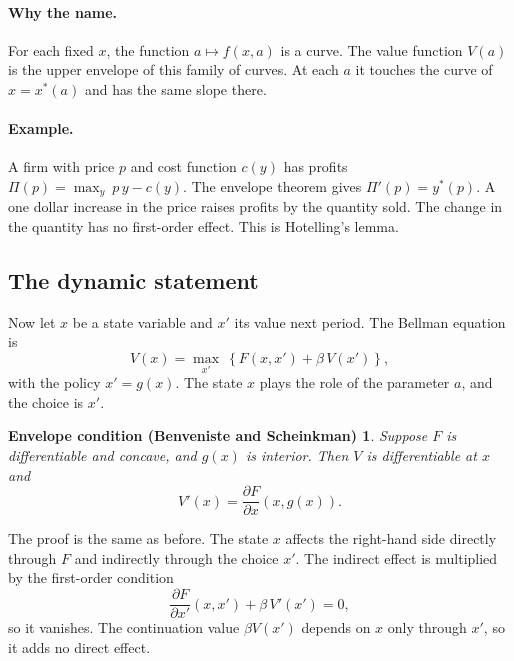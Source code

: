 \documentclass[11pt]{article}
\newtheorem*{envelopedyn}{Envelope condition (Benveniste and Scheinkman)}
\begin{document}
\paragraph{Why the name.} For each fixed $x$, the function $a \mapsto f(x, a)$ is a curve. The value function $V(a)$ is the upper envelope of this family of curves. At each $a$ it touches the curve of $x = x^{*}(a)$ and has the same slope there.

\paragraph{Example.} A firm with price $p$ and cost function $c(y)$ has profits $\Pi(p) = \max_{y} \ p\, y - c(y)$. The envelope theorem gives $\Pi'(p) = y^{*}(p)$. A one dollar increase in the price raises profits by the quantity sold. The change in the quantity has no first-order effect. This is Hotelling's lemma.

\subsection{The dynamic statement}

Now let $x$ be a state variable and $x'$ its value next period. The Bellman equation is
\begin{equation*}
V(x) = \max_{x'} \ \left\{ F(x, x') + \beta\, V(x') \right\} ,
\end{equation*}
with the policy $x' = g(x)$. The state $x$ plays the role of the parameter $a$, and the choice is $x'$.

\begin{envelopedyn}
Suppose $F$ is differentiable and concave, and $g(x)$ is interior. Then $V$ is differentiable at $x$ and
\begin{equation*}
V'(x) = \frac{\partial F}{\partial x} \left( x, g(x) \right) .
\end{equation*}
\end{envelopedyn}

The proof is the same as before. The state $x$ affects the right-hand side directly through $F$ and indirectly through the choice $x'$. The indirect effect is multiplied by the first-order condition
\begin{equation*}
\frac{\partial F}{\partial x'} \left( x, x' \right) + \beta\, V'(x') = 0 ,
\end{equation*}
so it vanishes. The continuation value $\beta V(x')$ depends on $x$ only through $x'$, so it adds no direct effect.
\end{document}
